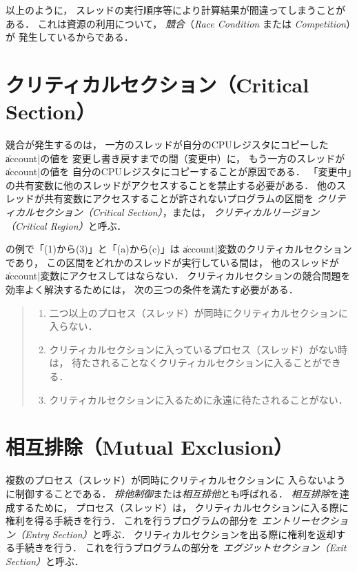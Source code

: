 以上のように，
スレッドの実行順序等により計算結果が間違ってしまうことがある．
これは資源の利用について，
\emph{競合}（\emph{Race Condition} または \emph{Competition}）が
発生しているからである．

\section{クリティカルセクション（Critical Section）}
\label{criticalsection}
競合が発生するのは，
一方のスレッドが自分のCPUレジスタにコピーした\|account|の値を
変更し書き戻すまでの間（変更中）に，
もう一方のスレッドが\|account|の値を
自分のCPUレジスタにコピーすることが原因である．
「変更中」の共有変数に他のスレッドがアクセスすることを禁止する必要がある．
他のスレッドが共有変数にアクセスすることが許されないプログラムの区間を
\emph{クリティカルセクション（Critical Section）}，または，
\emph{クリティカルリージョン（Critical Region）}と呼ぶ．

の例で「(1)から(3)」と「(a)から(c)」は
\|account|変数のクリティカルセクションであり，
この区間をどれかのスレッドが実行している間は，
他のスレッドが\|account|変数にアクセスしてはならない．
クリティカルセクションの競合問題を効率よく解決するためには，
次の三つの条件を満たす必要がある．

\begin{quote}
  \begin{enumerate}
  \item 二つ以上のプロセス（スレッド）が同時にクリティカルセクションに入らない．
  \item クリティカルセクションに入っているプロセス（スレッド）がない時は，
    待たされることなくクリティカルセクションに入ることができる．
  \item クリティカルセクションに入るために永遠に待たされることがない．
  \end{enumerate}
\end{quote}

\section{相互排除（Mutual Exclusion）}
複数のプロセス（スレッド）が同時にクリティカルセクションに
入らないように制御することである．
\emph{排他制御}または\emph{相互排他}とも呼ばれる．
\emph{相互排除}を達成するために，
プロセス（スレッド）は，
クリティカルセクションに入る際に権利を得る手続きを行う．
これを行うプログラムの部分を
\emph{エントリーセクション（Entry Section）}と呼ぶ．
クリティカルセクションを出る際に権利を返却する手続きを行う．
これを行うプログラムの部分を
\emph{エグジットセクション（Exit Section）}と呼ぶ．


